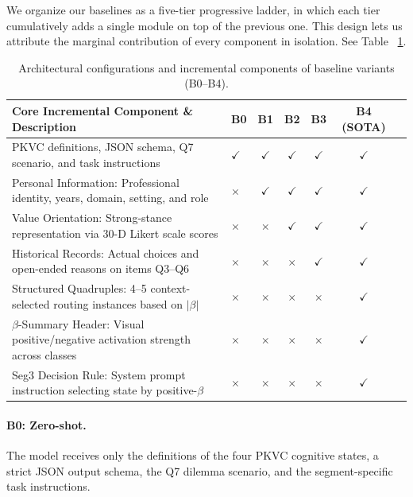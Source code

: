 \documentclass[11pt]{article}
\begin{document}
We organize our baselines as a five-tier progressive ladder, in which each
tier cumulatively adds a single module on top of the previous one. This
design lets us attribute the marginal contribution of every component in
isolation. See Table ~\ref{tab:baseline_configurations_wide}.
\begin{table}[t]
\centering
\small
\caption{Architectural configurations and incremental components of baseline variants (B0–B4).}
\label{tab:baseline_configurations_wide}
\begin{tabular}{l l ccccc}
\toprule
\textbf{Core Incremental Component \& Description} & \textbf{B0} & \textbf{B1} & \textbf{B2} & \textbf{B3} & \textbf{B4 (SOTA)} \\
\midrule
PKVC definitions, JSON schema, Q7 scenario, and task instructions & $\checkmark$ & $\checkmark$ & $\checkmark$ & $\checkmark$ & $\checkmark$ \\
\midrule
Personal Information: Professional identity, years, domain, setting, and role & $\times$ & $\checkmark$ & $\checkmark$ & $\checkmark$ & $\checkmark$ \\
\midrule
Value Orientation: Strong-stance representation via 30-D Likert scale scores & $\times$ & $\times$ & $\checkmark$ & $\checkmark$ & $\checkmark$ \\
\midrule
Historical Records: Actual choices and open-ended reasons on items Q3–Q6 & $\times$ & $\times$ & $\times$ & $\checkmark$ & $\checkmark$ \\
\midrule
Structured Quadruples: 4–5 context-selected routing instances based on $|\beta|$ & $\times$ & $\times$ & $\times$ & $\times$ & $\checkmark$ \\
$\beta$-Summary Header: Visual positive/negative activation strength across classes & $\times$ & $\times$ & $\times$ & $\times$ & $\checkmark$ \\
Seg3 Decision Rule: System prompt instruction selecting state by positive-$\beta$ & $\times$ & $\times$ & $\times$ & $\times$ & $\checkmark$ \\
\bottomrule
\end{tabular}
\end{table}
\paragraph{B0: Zero-shot.}
The model receives only the definitions of the four PKVC cognitive states, a strict JSON output schema, the Q7 dilemma scenario, and the segment-specific task instructions.
\end{document}
